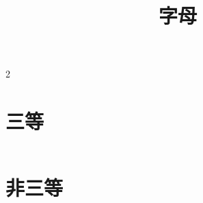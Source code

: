 
\usepackage{multicol}
\title{字母}


\maketitle

\begin{multicols}{2}
    \section{三等}
    \begin{center}
        \kaishu
        \begin{tabular}{ccccccc}
            
        \end{tabular}
    \end{center}
    \vfill
    \section{非三等}
    \begin{center}
        \kaishu
        \begin{tabular}{ccccccc}
            
        \end{tabular}
    \end{center}
\end{multicols}


